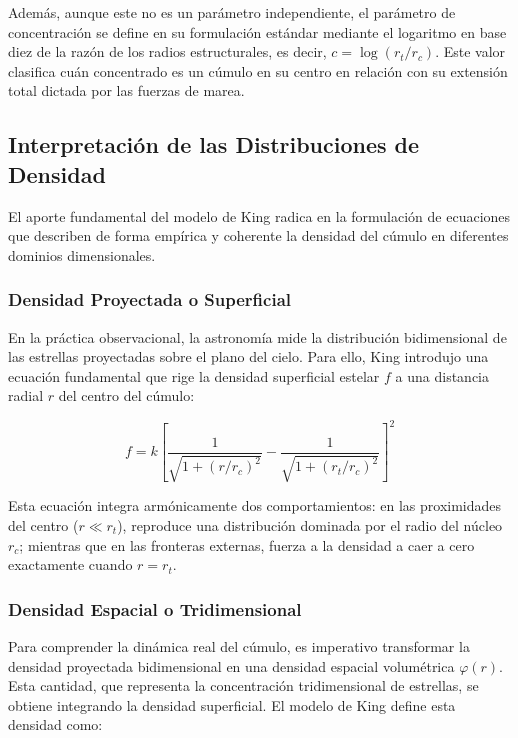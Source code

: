         Además, aunque este no es un parámetro independiente, el parámetro de 
        concentración se define en su formulación estándar mediante el 
        logaritmo en base diez de la razón de los radios estructurales, es 
        decir, $c = \log(r_t/r_c)$. Este valor clasifica cuán concentrado es un 
        cúmulo en su centro en relación con su extensión total dictada por las 
        fuerzas de marea.

    \subsection{Interpretación de las Distribuciones de Densidad}
        El aporte fundamental del modelo de King radica en la formulación de 
        ecuaciones que describen de forma empírica y coherente la densidad del 
        cúmulo en diferentes dominios dimensionales.

        \subsubsection{Densidad Proyectada o Superficial}
            En la práctica observacional, la astronomía mide la distribución 
            bidimensional de las estrellas proyectadas sobre el plano del cielo. 
            Para ello, King introdujo una ecuación fundamental que rige la 
            densidad superficial estelar $f$ a una distancia radial $r$ del 
            centro del cúmulo:

            \begin{equation}
                f = k \left[ \frac{1}{\sqrt{1 + (r/r_c)^2}} - \frac{1}{\sqrt{1 + 
                (r_t/r_c)^2}} \right]^2
                \label{eq:den_2d}
            \end{equation}

            Esta ecuación integra armónicamente dos comportamientos: en las 
            proximidades del centro ($r \ll r_t$), reproduce una distribución 
            dominada por el radio del núcleo $r_c$; mientras que en las 
            fronteras externas, fuerza a la densidad a caer a cero exactamente 
            cuando $r = r_t$.

        \subsubsection{Densidad Espacial o Tridimensional}
            Para comprender la dinámica real del cúmulo, es imperativo 
            transformar la densidad proyectada bidimensional en una densidad 
            espacial volumétrica $\varphi(r)$. Esta cantidad, que representa la 
            concentración tridimensional de estrellas, se obtiene integrando la 
            densidad superficial. El modelo de King define esta densidad como:

